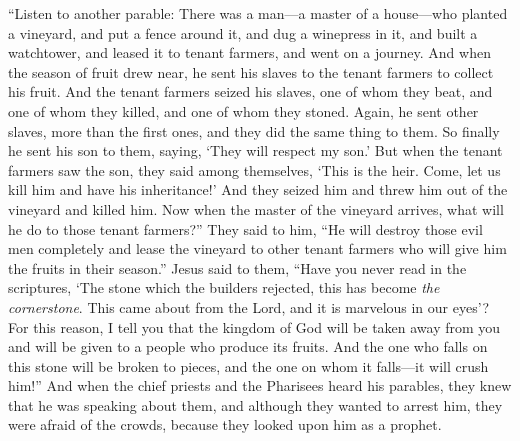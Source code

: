 \begin{biblechapter}
 “Listen to another parable: There was a man—a master of a house—who planted a vineyard, and put a fence around it, and dug a winepress in it, and built a watchtower, and leased it to tenant farmers, and went on a journey.
\verse And when the season of fruit drew near, he sent his slaves to the tenant farmers to collect his fruit.
\verse And the tenant farmers seized his slaves, one of whom they beat, and one of whom they killed, and one of whom they stoned.
\verse Again, he sent other slaves, more than the first ones, and they did the same thing to them.
\verse So finally he sent his son to them, saying, ‘They will respect my son.’
\verse But when the tenant farmers saw the son, they said among themselves, ‘This is the heir. Come, let us kill him and have his inheritance!’
\verse And they seized him and threw him out of the vineyard and killed him.
\verse Now when the master of the vineyard arrives, what will he do to those tenant farmers?”
\verse They said to him, “He will destroy those evil men completely and lease the vineyard to other tenant farmers who will give him the fruits in their season.”
\verse Jesus said to them, “Have you never read in the scriptures, ‘The stone which the builders rejected, 
this has become \textit{the cornerstone}. 
This came about from the Lord, 
and it is marvelous in our eyes’?
\verse For this reason, I tell you that the kingdom of God will be taken away from you and will be given to a people who produce its fruits.
\verse And the one who falls on this stone will be broken to pieces, and the one on whom it falls—it will crush him!”
\verse And when the chief priests and the Pharisees heard his parables, they knew that he was speaking about them,
\verse and although they wanted to arrest him, they were afraid of the crowds, because they looked upon him as a prophet.
\end{biblechapter}

